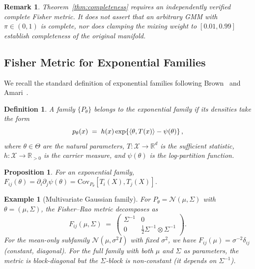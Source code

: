 \documentclass[a4paper,fleqn]{cas-dc}
\newtheorem{proposition}{Proposition}
\newtheorem{definition}{Definition}
\newtheorem{remark}{Remark}
\newtheorem{example}{Example}
\DeclarePairedDelimiter{\inner}{\langle}{\rangle}
\newcommand{\R}{\mathbb{R}}
\begin{document}
\begin{remark}%
  Theorem~\ref{thm:completeness} requires an independently verified
  complete Fisher metric. It does not assert that an arbitrary GMM
  with $\pi\in(0,1)$ is complete, nor does clamping the mixing weight
  to $[0.01,0.99]$ establish completeness of the original manifold.
\end{remark}

\subsection{Fisher Metric for Exponential Families}
\label{subsec:exp_family}
We recall the standard definition of exponential families following
Brown~\cite{brown1986fundamentals} and Amari~\cite{amari2000methods}.

\begin{definition}%
  \label{def:exp_family}
  A family $\{P_\theta\}$ belongs to the \emph{exponential family} if its
  densities take the form
  \begin{equation}
    p_\theta(x) \;=\; h(x)\exp\!\left\{\inner{\theta,T(x)} - \psi(\theta)\right\},
    \label{eq:exp_family}
  \end{equation}
  where $\theta\in\Theta$ are the \emph{natural parameters},
  $T:\mathcal{X}\to\R^d$ is the \emph{sufficient statistic},
  $h:\mathcal{X}\to\R_{>0}$ is the \emph{carrier measure}, and
  $\psi(\theta)$ is the \emph{log-partition function}.
\end{definition}

\begin{proposition}%
  \label{prop:fisher_exp}
  For an exponential family, $F_{ij}(\theta) = \partial_i\partial_j\psi(\theta)
  = \mathrm{Cov}_{P_\theta}[T_i(X), T_j(X)]$.
\end{proposition}

\begin{example}[Multivariate Gaussian family]
  \label{ex:gaussian}
  For $P_\theta = \mathcal{N}(\mu, \Sigma)$ with $\theta=(\mu,\Sigma)$,
  the Fisher--Rao metric decomposes as
  \begin{equation}
    F_{ij}(\mu,\Sigma) \;=\;
    \begin{pmatrix}
      \Sigma^{-1} & 0 \\
      0 & \frac{1}{2}\Sigma^{-1}\otimes\Sigma^{-1}
    \end{pmatrix}.
    \label{eq:fisher_gaussian}
  \end{equation}
  For the mean-only subfamily $\mathcal{N}(\mu,\sigma^2 I)$ with fixed
  $\sigma^2$, we have $F_{ij}(\mu) = \sigma^{-2}\delta_{ij}$ (constant,
  diagonal).
  For the \emph{full} family with both $\mu$ and $\Sigma$ as parameters,
  the metric is block-diagonal but the $\Sigma$-block is
  \emph{non-constant} (it depends on $\Sigma^{-1}$).
\end{example}
\end{document}

